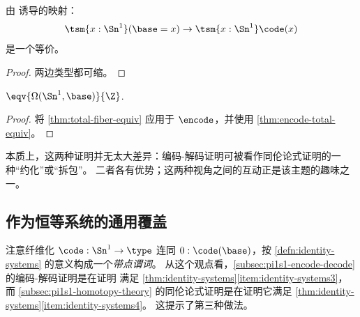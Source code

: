 \begin{cor}\label{thm:encode-total-equiv}
  由 \encode 诱导的映射：
  \[ \tsm{x:\Sn^1} (\base=x) \to \tsm{x:\Sn^1}\code(x) \]
  是一个等价。
\end{cor}
\begin{proof}
  两边类型都可缩。
\end{proof}

\begin{thm}
  $\eqv {\Omega(\Sn^1,\base)} {\Z}$.
\end{thm}
\begin{proof}
  将 \cref{thm:total-fiber-equiv} 应用于 $\encode$，并使用 \cref{thm:encode-total-equiv}。
\end{proof}

本质上，这两种证明并无太大差异：编码-解码证明可被看作同伦论式证明的一种“约化”或“拆包”。
二者各有优势；这两种视角之间的互动正是该主题的趣味之一。


\subsection{作为恒等系统的通用覆盖}
\label{sec:pi1s1-idsys}

注意纤维化 $\code:\Sn^1\to\type$ 连同 $0:\code(\base)$，按 \cref{defn:identity-systems} 的意义构成一个\emph{带点谓词}。
从这个观点看，\cref{subsec:pi1s1-encode-decode} 的编码-解码证明是在证明 \code 满足 \cref{thm:identity-systems}\ref{item:identity-systems3}，而 \cref{subsec:pi1s1-homotopy-theory} 的同伦论式证明是在证明它满足 \cref{thm:identity-systems}\ref{item:identity-systems4}。
这提示了第三种做法。

